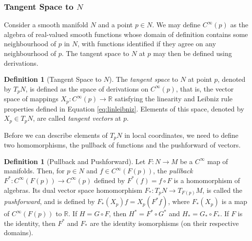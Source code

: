 \documentclass[psamsfonts]{amsart}
\theoremstyle{definition}
\newtheorem{defn}[thm]{Definition}
\theoremstyle{remark}
\newcommand*\R{\mathds{R}}
\numberwithin{equation}{section}
\begin{document}
\subsubsection{Tangent Space to $N$}
Consider a smooth manifold $N$ and a point $p \in N$. We may define $C^{\infty}(p)$ as the algebra of real-valued smooth functions whose domain of definition contains some neighbourhood of $p$ in $N$, with functions identified if they agree on any neighbourhood of $p$. The tangent space to $N$ at $p$ may then be defined using derivations. 
\begin{defn}[Tangent Space to $N$]\label{def:tangentspace}
The \textit{tangent space} to $N$ at point $p$, denoted by $T_pN$, is defined as the space of derivations on $C^{\infty}(p)$, that is, the vector space of mappings $X_p: C^{\infty}(p)\rightarrow \R$ satisfying the linearity and Leibniz rule properties defined in Equation \ref{eq:linleibniz}. Elements of this space, denoted by $X_p\in T_pN$, are called \textit{tangent vectors} at $p$. 
\end{defn} 

Before we can describe elements of $T_pN$ in local coordinates, we need to define two homomorphisms, the pullback of functions and the pushforward of vectors. 

\begin{defn}[Pullback and Pushforward]\label{def:pushforward}
Let $F:N\rightarrow M$ be a $C^{\infty}$ map of manifolds. Then, for $p\in N$ and $f\in C^{\infty}(F(p))$, the \textit{pullback} $F^*:C^{\infty}(F(p))\rightarrow C^{\infty}(p)$ defined by $F^*(f) = f\circ F$ is a homomorphism of algebras. Its dual vector space homomorphism $F_*:T_pN \rightarrow T_{F(p)}M$, is called the \textit{pushforward}, and is defined by $F_*(X_p)f = X_p(F^*f)$, where $F_*(X_p)$ is a map of $C^{\infty}(F(p))$ to $\R$. If $H = G\circ F$, then $H^* = F^* \circ G^*$ and $H_* = G_* \circ F_*$. If $F$ is the identity, then $F^*$ and $F_*$ are the identity isomorphisms (on their respective domains). 
\end{defn}
\end{document}
